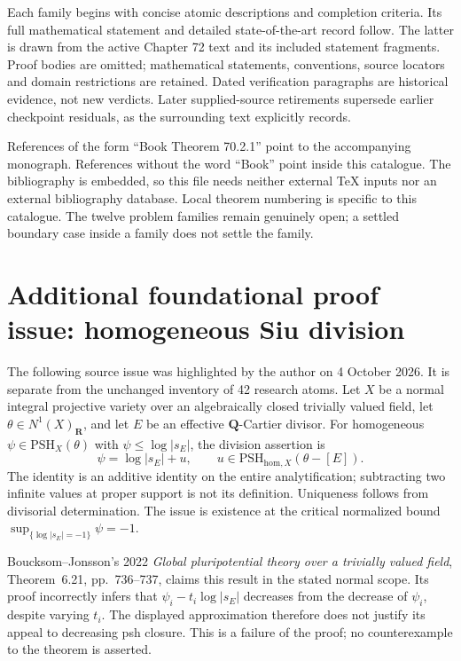 \documentclass[11pt,a4paper]{article}
\theoremstyle{definition}
\theoremstyle{remark}
\newcommand{\PSH}{\mathrm{PSH}}
\begin{document}
Each family begins with concise atomic descriptions and completion
criteria. Its full mathematical statement and detailed state-of-the-art
record follow. The latter is drawn from the active Chapter 72 text and its
included statement fragments. Proof bodies are omitted; mathematical
statements, conventions, source locators and domain restrictions are
retained. Dated verification paragraphs are historical evidence, not new
verdicts. Later supplied-source retirements supersede earlier checkpoint
residuals, as the surrounding text explicitly records.

References of the form ``Book Theorem 70.2.1'' point to the accompanying
monograph. References without the word ``Book'' point inside this catalogue.
The bibliography is embedded, so this file needs neither external TeX
inputs nor an external bibliography database. Local theorem numbering is
specific to this catalogue. The twelve problem families remain genuinely
open; a settled boundary case inside a family does not settle the family.

\section*{Additional foundational proof issue: homogeneous Siu division}
The following source issue was highlighted by the author on 4 October
2026. It is separate from the unchanged inventory of 42 research atoms.
Let $X$ be a normal integral projective variety over an algebraically closed
trivially valued field, let $\theta\in N^1(X)_{\mathbf R}$, and let $E$ be
an effective $\mathbf Q$-Cartier divisor. For homogeneous
$\psi\in\PSH_X(\theta)$ with $\psi\leq\log|s_E|$, the division assertion is
\[
 \psi=\log|s_E|+u,
 \qquad u\in\PSH_{\mathrm{hom},X}(\theta-[E]).
\]
The identity is an additive identity on the entire analytification;
subtracting two infinite values at proper support is not its definition.
Uniqueness follows from divisorial determination. The issue is existence
at the critical normalized bound $\sup_{\{\log|s_E|=-1\}}\psi=-1$.

Boucksom--Jonsson's 2022 \emph{Global pluripotential theory over a trivially
valued field}, Theorem~6.21, pp.~736--737, claims this result in the stated
normal scope. Its proof incorrectly infers that
$\psi_i-t_i\log|s_E|$ decreases from the decrease of $\psi_i$, despite
varying $t_i$. The displayed approximation therefore does not justify
its appeal to decreasing psh closure. This is a failure of the proof;
no counterexample to the theorem is asserted.
\end{document}
